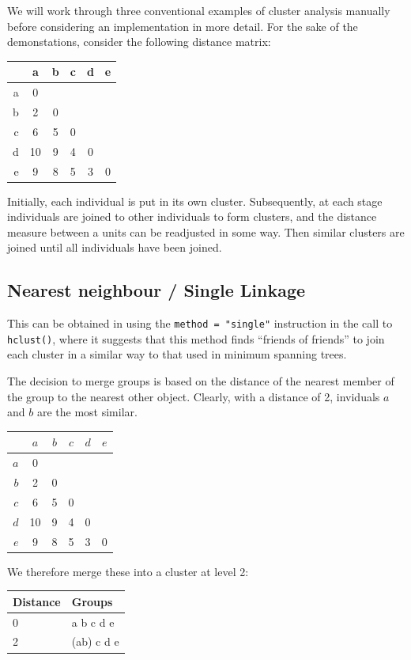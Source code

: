 We will work through three conventional examples of cluster analysis manually before considering an \R implementation in more detail.   For the sake of the demonstations, consider the following distance matrix:

\begin{tabular}{r|ccccc}
 & a & b & c & d & e\\
\hline
a & 0  &   &   &   &\\
b & 2  & 0 &   &   &\\
c & 6  & 5 & 0 &   & \\
d & 10 & 9 & 4 & 0 &  \\
e & 9  & 8 & 5 & 3 & 0\\
\end{tabular}

Initially, each individual is put in its own cluster.   Subsequently, at each stage individuals are joined to other individuals to form clusters, and the distance measure between a units can be readjusted in some way.   Then similar clusters are joined until all individuals have been joined.

\subsection{Nearest neighbour / Single Linkage}

This can be obtained in \R using the \verb+method = "single"+ instruction in the call to \verb+hclust()+, where it suggests that this method finds ``friends of friends'' to join each cluster in a similar way to that used in minimum spanning trees.

The decision to merge groups is based on the distance of the nearest member of the group to the nearest other object.   Clearly, with a distance of 2, inviduals $a$ and $b$ are the most similar.

\begin{minipage}[c]{0.5\textwidth}
\begin{tabular}{r|ccccc}
 & $a$ & $b$ & $c$ & $d$ & $e$\\
\hline
$a$ & 0  &   &   &   &\\
$b$ & 2  & 0 &   &   &\\
$c$ & 6  & 5 & 0 &   & \\
$d$ & 10 & 9 & 4 & 0 &  \\
$e$ & 9  & 8 & 5 & 3 & 0\\
\end{tabular}
\end{minipage}
\begin{minipage}[c]{0.5\textwidth}

We therefore merge these into a cluster at level 2:

\begin{tabular}{ll}
Distance & Groups\\
\hline
0 & a b c d e\\
2 & (ab) c d e
\end{tabular}
\end{minipage}

